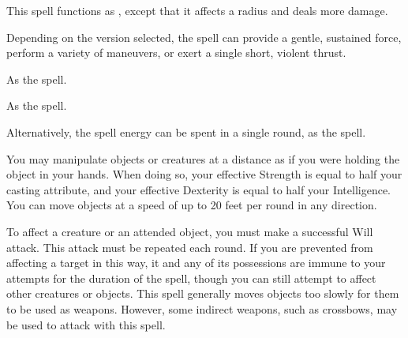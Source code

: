 \spelleffect This spell functions as , except that it affects a \areamed radius and deals more damage.

\begin{comment}
\subsubsection{T}
\end{comment}

\spelleffect Depending on the version selected, the spell can provide a gentle, sustained force, perform a variety of maneuvers, or exert a single short, violent thrust.
\par {} As the  spell.

\par {} As the  spell.

\par {} Alternatively, the spell energy can be spent in a single round, as the  spell.

\spelleffect You may manipulate objects or creatures at a distance as if you were holding the object in your hands. When doing so, your effective Strength is equal to half your casting attribute, and your effective Dexterity is equal to half your Intelligence. You can move objects at a speed of up to 20 feet per round in any direction.

To affect a creature or an attended object, you must make a successful Will attack. This attack must be repeated each round. If you are prevented from affecting a target in this way, it and any of its possessions are immune to your attempts for the duration of the spell, though you can still attempt to affect other creatures or objects. 
\spellnotes This spell generally moves objects too slowly for them to be used as weapons. However, some indirect weapons, such as crossbows, may be used to attack with this spell. 

